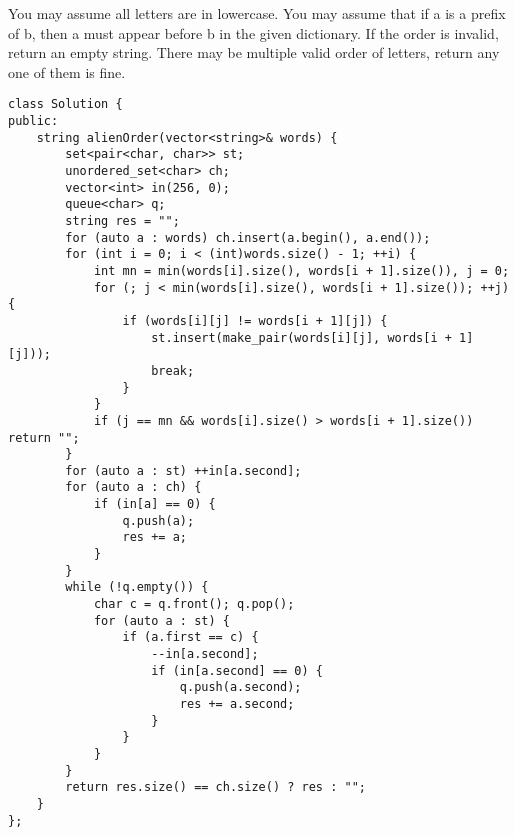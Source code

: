     You may assume all letters are in lowercase.
    You may assume that if a is a prefix of b, then a must appear before b in the given dictionary.
    If the order is invalid, return an empty string.
    There may be multiple valid order of letters, return any one of them is fine.
\begin{lstlisting}
class Solution {
public:
    string alienOrder(vector<string>& words) {
        set<pair<char, char>> st;
        unordered_set<char> ch;
        vector<int> in(256, 0);
        queue<char> q;
        string res = "";
        for (auto a : words) ch.insert(a.begin(), a.end());
        for (int i = 0; i < (int)words.size() - 1; ++i) {
            int mn = min(words[i].size(), words[i + 1].size()), j = 0;
            for (; j < min(words[i].size(), words[i + 1].size()); ++j) {
                if (words[i][j] != words[i + 1][j]) {
                    st.insert(make_pair(words[i][j], words[i + 1][j]));
                    break;
                }
            }
            if (j == mn && words[i].size() > words[i + 1].size()) return "";
        }
        for (auto a : st) ++in[a.second];
        for (auto a : ch) {
            if (in[a] == 0) {
                q.push(a);
                res += a;
            } 
        }
        while (!q.empty()) {
            char c = q.front(); q.pop();
            for (auto a : st) {
                if (a.first == c) {
                    --in[a.second];
                    if (in[a.second] == 0) {
                        q.push(a.second);
                        res += a.second;
                    }
                }
            }
        }
        return res.size() == ch.size() ? res : "";
    }
};
\end{lstlisting}






